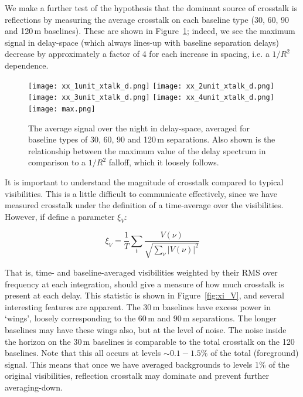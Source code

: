\documentclass[10pt,a4paper,notitlepage]{article}
\begin{document}
We make a further test of the hypothesis that the dominant source of crosstalk is reflections by measuring the average crosstalk on each baseline type (30, 60, 90 and 120\,m baselines). These are shown in Figure~\ref{fig:the-money-plot}; indeed, we see the maximum signal in delay-space (which always lines-up with baseline separation delays) decrease by approximately a factor of 4 for each increase in spacing, i.e. a $1/R^2$ dependence.\\

\begin{figure}
\centering
\texttt{[image: xx\_1unit\_xtalk\_d.png]}
\texttt{[image: xx\_2unit\_xtalk\_d.png]}
\texttt{[image: xx\_3unit\_xtalk\_d.png]}
\texttt{[image: xx\_4unit\_xtalk\_d.png]}
\texttt{[image: max.png]}
\caption{The average signal over the night in delay-space, averaged for baseline types of 30, 60, 90 and 120\,m separations. Also shown is the relationship between the maximum value of the delay spectrum in comparison to a $1/R^2$ falloff, which it loosely follows.}
\label{fig:the-money-plot}
\end{figure}

It is important to understand the magnitude of crosstalk compared to typical visibilities. This is a little difficult to communicate effectively, since we have measured crosstalk under the definition of a time-average over the visibilities. However, if define a parameter $\xi_V$: 

\begin{equation}
\xi_V=\frac{1}{T}\sum_t\frac{V(\nu)}{\sqrt{\sum_\nu|V(\nu)|^2}}
\end{equation}

That is, time- and baseline-averaged visibilities weighted by their RMS over frequency at each integration, should give a measure of how much crosstalk is present at each delay. This statistic is shown in Figure~\ref{fig:xi_V}, and several interesting features are apparent. The 30\,m baselines have excess power in `wings', loosely corresponding to the 60\,m and 90\,m separations. The longer baselines may have these wings also, but at the level of noise. The noise inside the horizon on the 30\,m baselines is comparable to the total crosstalk on the 120\, baselines.
Note that this all occurs at levels $\sim0.1-1.5\%$ of the total (foreground) signal. This means that once we have averaged backgrounds to levels 1\% of the original visibilities, reflection crosstalk may dominate and prevent further averaging-down. \\
\end{document}
